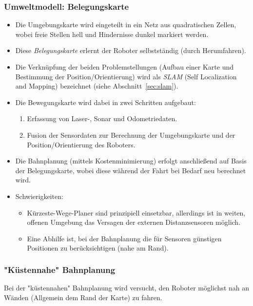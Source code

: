 			\subsubsection{Umweltmodell: Belegungskarte}
				\begin{itemize}
					\item Die Umgebungskarte wird eingeteilt in ein Netz aus quadratischen Zellen, wobei freie Stellen hell und Hindernisse dunkel markiert werden.
					\item Diese \emph{Belegungskarte} erlernt der Roboter selbstständig (durch Herumfahren).
					\item Die Verknüpfung der beiden Problemstellungen (Aufbau einer Karte und Bestimmung der Position/Orientierung) wird als \emph{SLAM} (Self Localization and Mapping) bezeichnet (siehe Abschnitt~\ref{sec:slam}).
					\item Die Bewegungskarte wird dabei in zwei Schritten aufgebaut:
						\begin{enumerate}
							\item Erfassung von Laser-, Sonar und Odometriedaten.
							\item Fusion der Sensordaten zur Berechnung der Umgebungskarte und der Position/Orientierung des Roboters.
						\end{enumerate}
					\item Die Bahnplanung (mittels Kostenminimierung) erfolgt anschließend auf Basis der Belegungskarte, wobei diese während der Fahrt bei Bedarf neu berechnet wird.
					\item Schwierigkeiten:
						\begin{itemize}
							\item Kürzeste-Wege-Planer sind prinzipiell einsetzbar, allerdings ist in weiten, offenen Umgebung das Versagen der externen Distanzsensoren möglich.
							\item Eine Abhilfe ist, bei der Bahnplanung die für Sensoren günstigen Positionen zu berücksichtigen (\zB nahe am Rand).
						\end{itemize}
				\end{itemize}

			\subsubsection{"Küstennahe" Bahnplanung}
				Bei der "küstennahen" Bahnplanung wird versucht, den Roboter möglichst nah an Wänden (\bzw Allgemein dem Rand der Karte) zu fahren.

